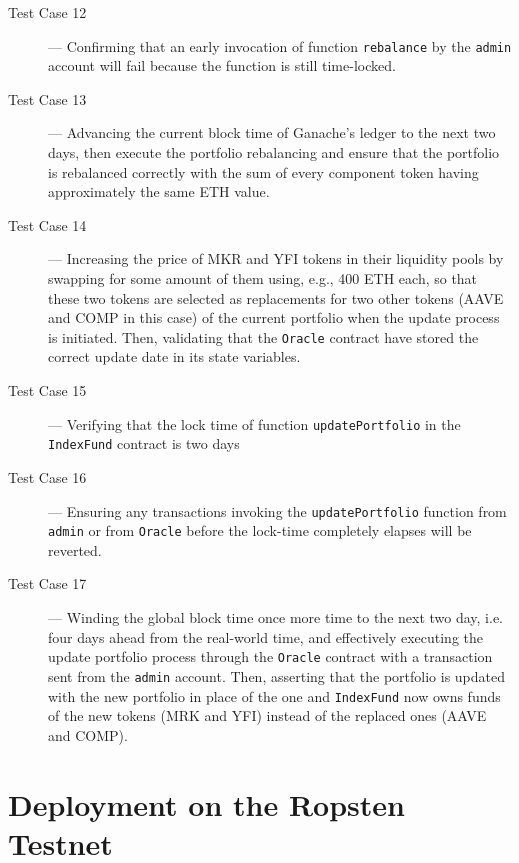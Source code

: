 \begin{description}
    \item[Test Case 12] --- Confirming that an early invocation of function \texttt{rebalance} by the \texttt{admin} account will fail because the function is still time-locked.
    
    \item[Test Case 13] --- Advancing the current block time of Ganache's ledger to the next two days, then execute the portfolio rebalancing and ensure that the portfolio is rebalanced correctly with the sum of every component token having approximately the same ETH value.
    
    \item[Test Case 14] --- Increasing the price of MKR and YFI tokens in their liquidity pools by swapping for some amount of them using, e.g., 400 ETH each, so that these two tokens are selected as replacements for two other tokens (AAVE and COMP in this case) of the current portfolio when the update process is initiated. Then, validating that the \texttt{Oracle} contract have stored the correct update date in its state variables.
    
    \item[Test Case 15] --- Verifying that the lock time of function \texttt{updatePortfolio} in the \texttt{IndexFund} contract is two days
    
    \item[Test Case 16] --- Ensuring any transactions invoking the \texttt{updatePortfolio} function from \texttt{admin} or from \texttt{Oracle} before the lock-time completely elapses will be reverted.
    
    \item[Test Case 17] --- Winding the global block time once more time to the next two day, i.e. four days ahead from the real-world time, and effectively executing the update portfolio process through the \texttt{Oracle} contract with a transaction sent from the \texttt{admin} account. Then, asserting that the portfolio is updated with the new portfolio in place of the one and \texttt{IndexFund} now owns funds of the new tokens (MRK and YFI) instead of the replaced ones (AAVE and COMP).
    
\end{description}




\section{Deployment on the Ropsten Testnet} \label{sec:ropsten_tesnet}


